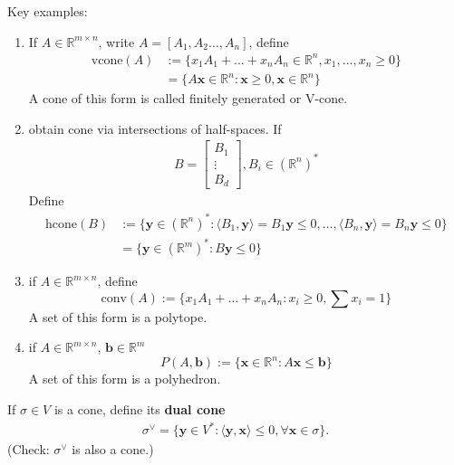 \documentclass[a4paper,12pt]{amsart}
\newcommand{\RR}{\mathbb{R}}
\newcommand{\bfx}{\mathbf{x}}
\newcommand{\bfy}{\mathbf{y}}
\newcommand{\bfb}{\mathbf{b}}
\begin{document}
\begin{Eg}Key examples:
\begin{enumerate}
\item If $A\in \RR^{m\times n}$, write $A=[A_1, A_2\dots, A_n]$, define
\begin{align*}
\text{vcone}(A)&:=\{x_1A_1+\dots+x_nA_n\in\RR^n,x_1,\dots,x_n\geq 0\}\\
&=\{A\bfx\in\RR^n: \bfx\geq 0, \bfx\in \RR^n\}
\end{align*}
A cone of this form is called finitely generated or V-cone.
\item obtain cone via intersections of half-spaces. If
\begin{align*}
B=\begin{bmatrix}
B_1\\
\vdots\\
B_d
\end{bmatrix}, B_i\in(\RR^n)^{*}
\end{align*}
Define
\begin{align*}
\text{hcone}(B)&:=\{\bfy\in(\RR^n)^{*}:\langle B_1,\bfy \rangle=B_1\bfy\leq 0,\dots,\langle B_n,\bfy \rangle=B_n\bfy\leq 0\}\\
&=\{\bfy\in(\RR^m)^*:B\bfy\leq 0\}
\end{align*}
\item if $A\in\RR^{m\times n}$, define
\begin{equation*}
\text{conv}(A):=\{x_1A_1+\dots+x_nA_n:x_i\geq 0,\sum x_i=1\}
\end{equation*}
A set of this form is a polytope.
\item if $A\in\RR^{m\times n}$, $\bfb\in\RR^m$
\begin{equation*}
P(A,\bfb):=\{\bfx\in\RR^n:A\bfx\leq \bfb\}
\end{equation*}
A set of this form is a polyhedron.
\end{enumerate}
\end{Eg}
\begin{Def}
If $\sigma\in V$ is a cone, define its \textbf{dual cone}
\begin{align*}
\sigma^{\vee}=\{\bfy\in V^{*}:\langle \bfy,\bfx\rangle\leq 0, \forall \bfx\in\sigma\}.
\end{align*} 
(Check: $\sigma^{\vee}$ is also a cone.)
\end{Def}
\end{document}
